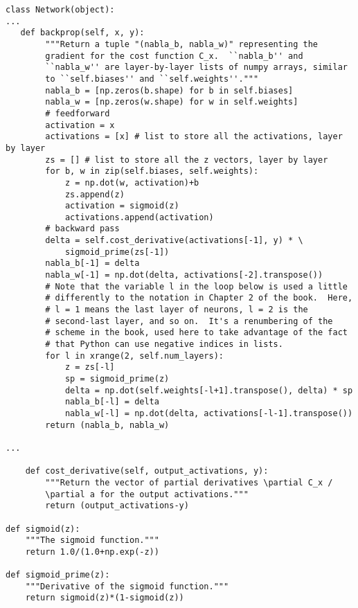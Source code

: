 \begin{lstlisting}
class Network(object):
...
   def backprop(self, x, y):
        """Return a tuple "(nabla_b, nabla_w)" representing the
        gradient for the cost function C_x.  ``nabla_b'' and
        ``nabla_w'' are layer-by-layer lists of numpy arrays, similar
        to ``self.biases'' and ``self.weights''."""
        nabla_b = [np.zeros(b.shape) for b in self.biases]
        nabla_w = [np.zeros(w.shape) for w in self.weights]
        # feedforward
        activation = x
        activations = [x] # list to store all the activations, layer by layer
        zs = [] # list to store all the z vectors, layer by layer
        for b, w in zip(self.biases, self.weights):
            z = np.dot(w, activation)+b
            zs.append(z)
            activation = sigmoid(z)
            activations.append(activation)
        # backward pass
        delta = self.cost_derivative(activations[-1], y) * \
            sigmoid_prime(zs[-1])
        nabla_b[-1] = delta
        nabla_w[-1] = np.dot(delta, activations[-2].transpose())
        # Note that the variable l in the loop below is used a little
        # differently to the notation in Chapter 2 of the book.  Here,
        # l = 1 means the last layer of neurons, l = 2 is the
        # second-last layer, and so on.  It's a renumbering of the
        # scheme in the book, used here to take advantage of the fact
        # that Python can use negative indices in lists.
        for l in xrange(2, self.num_layers):
            z = zs[-l]
            sp = sigmoid_prime(z)
            delta = np.dot(self.weights[-l+1].transpose(), delta) * sp
            nabla_b[-l] = delta
            nabla_w[-l] = np.dot(delta, activations[-l-1].transpose())
        return (nabla_b, nabla_w)

...

    def cost_derivative(self, output_activations, y):
        """Return the vector of partial derivatives \partial C_x /
        \partial a for the output activations."""
        return (output_activations-y) 

def sigmoid(z):
    """The sigmoid function."""
    return 1.0/(1.0+np.exp(-z))

def sigmoid_prime(z):
    """Derivative of the sigmoid function."""
    return sigmoid(z)*(1-sigmoid(z))
\end{lstlisting}
